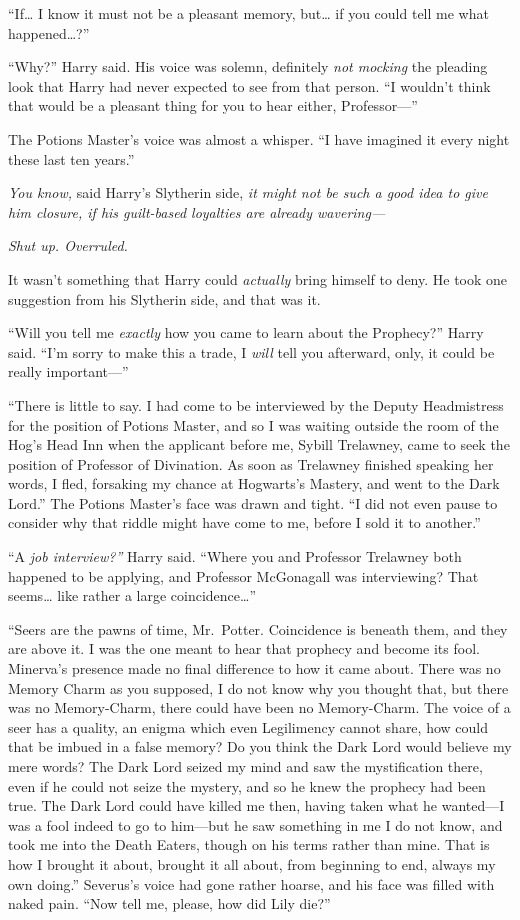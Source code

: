 ``If\ldots{} I know it must not be a pleasant memory, but\ldots{} if you
could tell me what happened\ldots{}?''

``Why?'' Harry said. His voice was solemn, definitely \emph{not mocking}
the pleading look that Harry had never expected to see from that person.
``I wouldn't think that would be a pleasant thing for you to hear
either, Professor---''

The Potions Master's voice was almost a whisper. ``I have imagined it
every night these last ten years.''

\emph{You know,} said Harry's Slytherin side, \emph{it might not be such
a good idea to give him closure, if his guilt-based loyalties are
already wavering---}

\emph{Shut up. Overruled.}

It wasn't something that Harry could \emph{actually} bring himself to
deny. He took one suggestion from his Slytherin side, and that was it.

``Will you tell me \emph{exactly} how you came to learn about the
Prophecy?'' Harry said. ``I'm sorry to make this a trade, I \emph{will}
tell you afterward, only, it could be really important---''

``There is little to say. I had come to be interviewed by the Deputy
Headmistress for the position of Potions Master, and so I was waiting
outside the room of the Hog's Head Inn when the applicant before me,
Sybill Trelawney, came to seek the position of Professor of Divination.
As soon as Trelawney finished speaking her words, I fled, forsaking my
chance at Hogwarts's Mastery, and went to the Dark Lord.'' The Potions
Master's face was drawn and tight. ``I did not even pause to consider
why that riddle might have come to me, before I sold it to another.''

``A \emph{job interview?''} Harry said. ``Where you and Professor
Trelawney both happened to be applying, and Professor McGonagall was
interviewing? That seems\ldots{} like rather a large
coincidence\ldots{}''

``Seers are the pawns of time, Mr.~Potter. Coincidence is beneath them,
and they are above it. I was the one meant to hear that prophecy and
become its fool. Minerva's presence made no final difference to how it
came about. There was no Memory Charm as you supposed, I do not know why
you thought that, but there was no Memory-Charm, there could have been
no Memory-Charm. The voice of a seer has a quality, an enigma which even
Legilimency cannot share, how could that be imbued in a false memory? Do
you think the Dark Lord would believe my mere words? The Dark Lord
seized my mind and saw the mystification there, even if he could not
seize the mystery, and so he knew the prophecy had been true. The Dark
Lord could have killed me then, having taken what he wanted---I was a
fool indeed to go to him---but he saw something in me I do not know, and
took me into the Death Eaters, though on his terms rather than mine.
That is how I brought it about, brought it all about, from beginning to
end, always my own doing.'' Severus's voice had gone rather hoarse, and
his face was filled with naked pain. ``Now tell me, please, how did Lily
die?''

